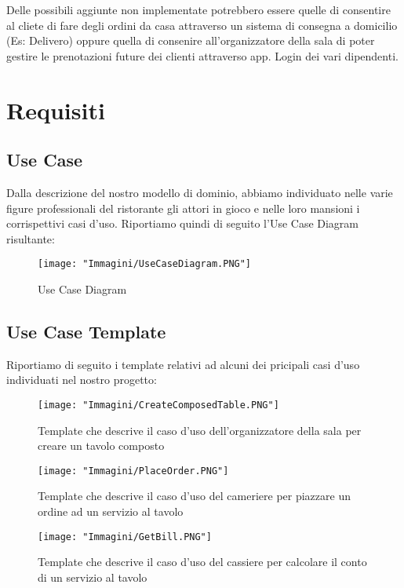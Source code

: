 \documentclass{article}
\begin{document}
Delle possibili aggiunte non implementate potrebbero essere quelle di consentire al cliete di fare degli ordini da casa attraverso un sistema di consegna a domicilio (Es: Delivero) oppure quella di consenire all'organizzatore della sala di poter gestire le prenotazioni future dei clienti attraverso app. Login dei vari dipendenti. 


\section{Requisiti}
\subsection{Use Case}
Dalla descrizione del nostro modello di dominio, abbiamo individuato nelle varie figure professionali del ristorante gli attori in gioco e nelle loro mansioni i corrispettivi casi d'uso. Riportiamo quindi di seguito l'Use Case Diagram risultante:

\begin{figure}[!h]
\centering
\texttt{[image: "Immagini/UseCaseDiagram.PNG"]}
\caption{Use Case Diagram}
\end{figure}

\newpage

\subsection{Use Case Template}
Riportiamo di seguito i template relativi ad alcuni dei pricipali casi d'uso individuati nel nostro progetto:

\begin{figure}[!h]
\centering
\texttt{[image: "Immagini/CreateComposedTable.PNG"]}
\caption{Template che descrive il caso d'uso dell'organizzatore della sala per creare un tavolo composto}
\end{figure}

\begin{figure}[!h]
\centering
\texttt{[image: "Immagini/PlaceOrder.PNG"]}
\caption{Template che descrive il caso d'uso del cameriere per piazzare un ordine ad un servizio al tavolo}
\end{figure}

\newpage

\begin{figure}[!h]
\centering
\texttt{[image: "Immagini/GetBill.PNG"]}
\caption{Template che descrive il caso d'uso del cassiere per calcolare il conto di un servizio al tavolo}
\end{figure}
\end{document}
